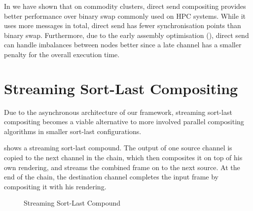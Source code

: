 In \cite{EP:07} we have shown that on commodity clusters, direct send
compositing provides better performance over binary swap commonly used on HPC
systems. While it uses more messages in total, direct send has fewer
synchronisation points than binary swap. Furthermore, due to the early assembly
optimisation (), direct send can handle imbalances between
nodes better since a late channel has a smaller penalty for the overall
execution time.

\section{Streaming Sort-Last Compositing}

Due to the asynchronous architecture of our framework, streaming sort-last
compositing becomes a viable alternative to more involved parallel compositing
algorithms in smaller sort-last configurations.

 shows a streaming sort-last compound. The output of one source
channel is copied to the next channel in the chain, which then composites it on
top of his own rendering, and streams the combined frame on to the next source.
At the end of the chain, the destination channel completes the input frame by
compositing it with his rendering.

\begin{figure}[h!t]\center
  \hfil{}
  {\caption{Streaming Sort-Last Compound}}
\end{figure}

